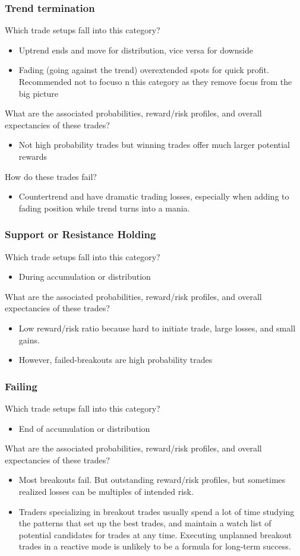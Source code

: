 \documentclass{../notes}
\begin{document}
\subsubsection{Trend termination}
Which trade setups fall into this category?
\begin{itemize}
  \item Uptrend ends and move for distribution, vice versa for downside
  \item Fading (going against the trend) overextended spots for quick profit. Recommended not to focuso n this category as they remove focus from the big picture
\end{itemize}
What are the associated probabilities, reward/risk profiles, and overall expectancies of these trades?
\begin{itemize}
  \item Not high probability trades but winning trades offer much larger potential rewards
\end{itemize}
How do these trades fail?
\begin{itemize}
  \item Countertrend and have dramatic trading losses, especially when adding to fading position while trend turns into a mania.
\end{itemize}
\subsubsection{Support or Resistance Holding}
Which trade setups fall into this category?
\begin{itemize}
  \item During accumulation or distribution
\end{itemize}
What are the associated probabilities, reward/risk profiles, and overall expectancies of these trades?
\begin{itemize}
  \item Low reward/risk ratio because hard to initiate trade, large losses, and small gains.
  \item However, failed-breakouts are high probability trades
\end{itemize}
\subsubsection{Failing}
Which trade setups fall into this category?
\begin{itemize}
  \item End of accumulation or distribution
\end{itemize}
What are the associated probabilities, reward/risk profiles, and overall expectancies of these trades?
\begin{itemize}
  \item Most breakouts fail. But outstanding reward/risk profiles, but sometimes realized losses can be multiples of intended risk.
  \item Traders specializing in breakout trades usually spend a lot of time studying the patterns that set up the best trades, and maintain a watch list of potential candidates for trades at any time. Executing unplanned breakout trades in a reactive mode is unlikely to be a formula for long-term success.
\end{itemize}
\end{document}
